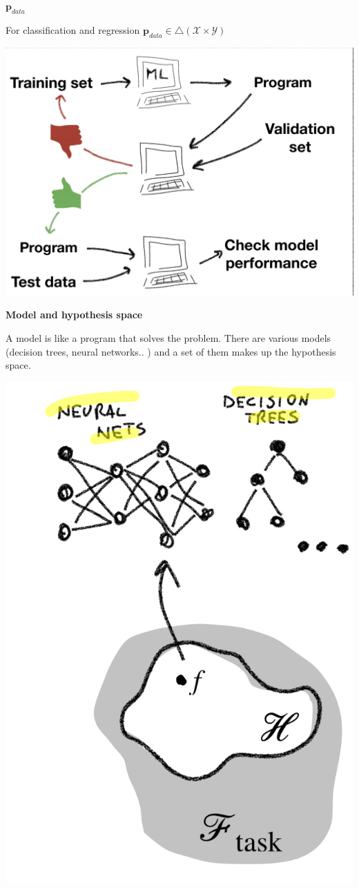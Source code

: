 \documentclass[oneside]{book}
\theoremstyle{definition}
\begin{document}
$\textbf{p}_{data}$ 

For classification and regression $\textbf{p}_{data} \in \triangle (\mathscr{X} \times \mathscr{Y})$

\includegraphics[scale=0.25]{datasets}

\textbf{Model and hypothesis space}

A model is like a program that solves the problem. There are various models (decision trees, neural networks.. ) and a set of them makes up the hypothesis space. 

\includegraphics[scale=0.24]{hypothesis_space}
\end{document}
